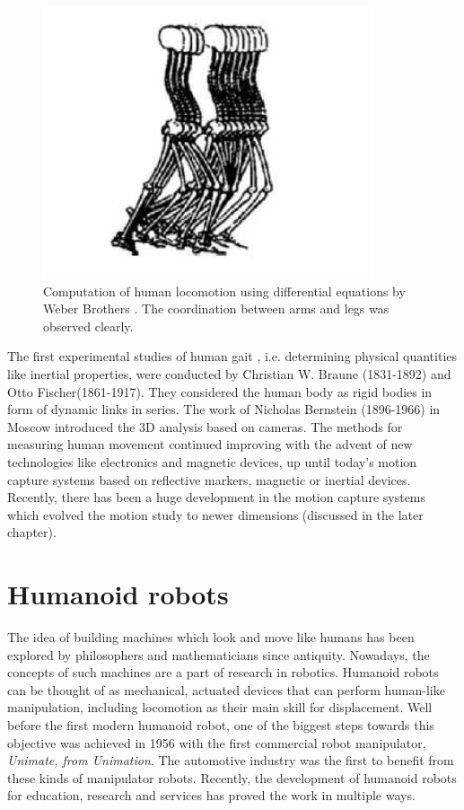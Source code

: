 \begin{figure}[h!]
\centering
\includegraphics[scale=0.4]{images/intro-2.png}\hfill
\caption[Human Locomotion using Differential Equations]{Computation of human locomotion using differential equations by Weber Brothers \cite{alma991010593879705596}. The coordination between arms and legs was observed clearly.}\hfill
\label{motion-coordination}
\end{figure}

The first experimental studies of human gait \cite{alma991010593879705596}, i.e. determining physical quantities 
like inertial properties, were conducted by Christian W. Braune (1831-1892) and Otto Fischer(1861-1917). They 
considered the human body as rigid bodies in form of dynamic links in series. The work of Nicholas Bernstein (1896-1966)
in Moscow introduced the 3D analysis based on cameras. The methods for measuring human movement continued improving 
with the advent of new technologies like electronics and magnetic devices, up until today’s motion capture systems 
based on reflective markers, magnetic or inertial devices. Recently, there has been a huge development in the motion 
capture systems which evolved the motion study to newer dimensions (discussed in the later chapter).

\section{Humanoid robots}

The idea of building machines which look and move like humans has been explored by philosophers and mathematicians
since antiquity. Nowadays, the concepts of such machines are a part of research in robotics. Humanoid robots can 
be thought of as mechanical, actuated devices that can perform human-like manipulation, including locomotion as 
their main skill for displacement. Well before the first modern humanoid robot, one of the biggest steps towards 
this objective was achieved in 1956 with the first commercial robot manipulator, \textit{Unimate, from Unimation}. 
The automotive industry was the first to benefit from these kinds of manipulator robots. Recently, the development 
of humanoid robots for education, research and services has proved the work in multiple ways. 

